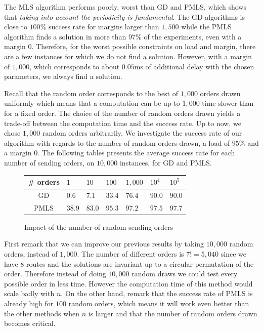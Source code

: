 \documentclass[10pt, conference, letterpaper]{IEEEtran}
\begin{document}
     The MLS algorithm performs poorly, worst than GD and PMLS, which shows that \emph{taking into account the periodicity is fundamental}.
     The GD algorithms is close to $100\%$ success rate for margins larger than $1,500$ while the PMLS algorithm finds a solution in more than $97\%$ of the experiments, even with a margin $0$. Therefore, for the worst possible constraints on load and margin, there are a few instances for which we do not find a solution. However, with a margin of $1,000$, which corresponds to about $0.05$ms of additional delay with the chosen parameters, we always find a solution. 
     
    Recall that the random order corresponds to the best of $1,000$ orders drawn uniformly which means that a computation can be up to $1,000$ time slower than for a fixed order. The choice of the number of random orders drawn yields a trade-off between the computation time and the success rate. Up to now, we chose $1,000$ random orders arbitrarily. We investigate the success rate of our algorithm with regards to the number of random orders drawn, a load of $95\%$ and a margin $0$. The following tables presents the average success rate for each number of sending orders, on $10,000$ instances, for GD and PMLS.
         \begin{figure}[h] 
       \begin{center}
   \begin{tabularx}{0.5\textwidth}{|c|X|X|X|X|X|X|}
    \hline
    \# orders& $1$ & $10$ & $100$& $1,000$& $10^{4}$&$10^{5}$\\
    \hline
    GD & $0.6$ &$7.1$&$33.4$&$76.4$&$90.0$&$90.0$\\
    \hline
  PMLS & $38.9$ &$83.0$&$95.3$&$97.2$&$97.5$&$97.7$\\
    \hline
      \end{tabularx}
      \end{center}
   \caption{Impact of the number of random sending orders}
     \end{figure}

First remark that we can improve our previous results by taking $10,000$ random orders,
instead of $1,000$. The number of different orders is $7!= 5,040$ since we have $8$ routes and the solutions are invariant up to a circular permutation of the order. Therefore instead of doing $10,000$ random draws we could test every possible order in less time. However the computation time of this method would scale badly with $n$. On the other hand, remark that the success rate of PMLS is already high for $100$ random orders, which means it will work even better than the other methods when $n$ is larger and that the number of random orders drawn becomes critical.
     
\end{document}
